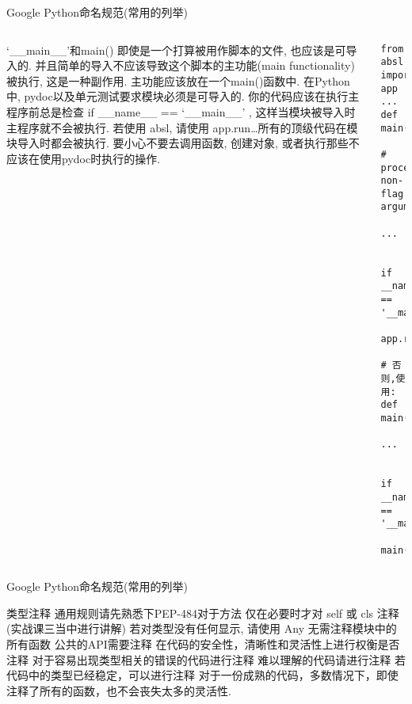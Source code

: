 \begin{frame}[fragile]{Google Python命名规范(常用的列举)}
    \begin{columns}
        \begin{myoutline}
            \1 `\_\_main\_\_'和main()
                \2 即使是一个打算被用作脚本的文件, 也应该是可导入的. 并且简单的导入不应该导致这个脚本的主功能(main functionality)被执行, 这是一种副作用. 主功能应该放在一个main()函数中.
                \2 在Python中, pydoc以及单元测试要求模块必须是可导入的. 你的代码应该在执行主程序前总是检查 if \_\_name\_\_ == `\_\_main\_\_' , 这样当模块被导入时主程序就不会被执行.
                \2 若使用 absl, 请使用 app.run\dots 所有的顶级代码在模块导入时都会被执行. 要小心不要去调用函数, 创建对象, 或者执行那些不应该在使用pydoc时执行的操作.
        \end{myoutline}
        \begin{lstlisting}
from absl import app 
... 
def main(argv): 
    # process non-flag arguments
    ... 


if __name__ == '__main__': 
    app.run(main)

# 否则,使用:
def main():
    ... 


if __name__ == '__main__': 
    main()
        \end{lstlisting}
    \end{columns}
\end{frame}

\begin{frame}[fragile]{Google Python命名规范(常用的列举)}
    \begin{myoutline}
        \1 类型注释
            \2 通用规则请先熟悉下PEP-484对于方法
            \2 仅在必要时才对 self 或 cls 注释(实战课三当中进行讲解)
            \2 若对类型没有任何显示, 请使用 Any
            \2 无需注释模块中的所有函数
            \2 公共的API需要注释
            \2 在代码的安全性，清晰性和灵活性上进行权衡是否注释
            \2 对于容易出现类型相关的错误的代码进行注释
            \2 难以理解的代码请进行注释
            \2 若代码中的类型已经稳定，可以进行注释
            \2 对于一份成熟的代码，多数情况下，即使注释了所有的函数，也不会丧失太多的灵活性.
    \end{myoutline}
\end{frame}